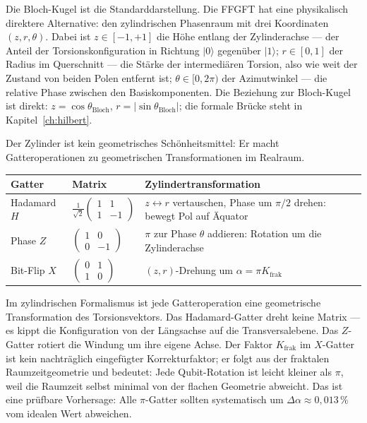 Die Bloch-Kugel ist die Standarddarstellung. Die FFGFT hat eine
physikalisch direktere Alternative: den zylindrischen Phasenraum mit
drei Koordinaten $(z,r,\theta)$. Dabei ist $z\in[-1,+1]$ die Höhe
entlang der Zylinderachse --- der Anteil der Torsionskonfiguration in
Richtung $|0\rangle$ gegenüber $|1\rangle$; $r\in[0,1]$ der Radius im
Querschnitt --- die Stärke der intermediären Torsion, also wie weit der
Zustand von beiden Polen entfernt ist; $\theta\in[0,2\pi)$ der
Azimutwinkel --- die relative Phase zwischen den Basiskomponenten. Die
Beziehung zur Bloch-Kugel ist direkt: $z = \cos\theta_{\mathrm{Bloch}}$,
$r = |\sin\theta_{\mathrm{Bloch}}|$; die formale Brücke steht in
Kapitel~\ref{ch:hilbert}.

Der Zylinder ist kein geometrisches Schönheitsmittel: Er macht
Gatteroperationen zu geometrischen Transformationen im Realraum.

\begin{center}
\small\renewcommand{\arraystretch}{1.4}
\begin{tabular}{lp{2.4cm}p{4.2cm}}
\toprule
\textbf{Gatter} & \textbf{Matrix} & \textbf{Zylindertransformation} \\
\midrule
Hadamard $H$ & $\frac{1}{\sqrt2}\begin{pmatrix}1&1\\1&-1\end{pmatrix}$ & $z\leftrightarrow r$ vertauschen, Phase um $\pi/2$ drehen: bewegt Pol auf Äquator \\
Phase $Z$ & $\begin{pmatrix}1&0\\0&-1\end{pmatrix}$ & $\pi$ zur Phase $\theta$ addieren: Rotation um die Zylinderachse \\
Bit-Flip $X$ & $\begin{pmatrix}0&1\\1&0\end{pmatrix}$ & $(z,r)$-Drehung um $\alpha = \pi K_{\mathrm{frak}}$ \\
\bottomrule
\end{tabular}
\end{center}

Im zylindrischen Formalismus ist jede Gatteroperation eine geometrische
Transformation des Torsionsvektors. Das Hadamard-Gatter dreht keine
Matrix --- es kippt die Konfiguration von der Längsachse auf die
Transversalebene. Das $Z$-Gatter rotiert die Windung um ihre eigene
Achse. Der Faktor $K_{\mathrm{frak}}$ im $X$-Gatter ist kein nachträglich
eingefügter Korrekturfaktor; er folgt aus der fraktalen
Raumzeitgeometrie und bedeutet: Jede Qubit-Rotation ist leicht kleiner
als $\pi$, weil die Raumzeit selbst minimal von der flachen Geometrie
abweicht. Das ist eine prüfbare Vorhersage: Alle $\pi$-Gatter sollten
systematisch um $\Delta\alpha\approx0{,}013\,\%$ vom idealen Wert
abweichen.

